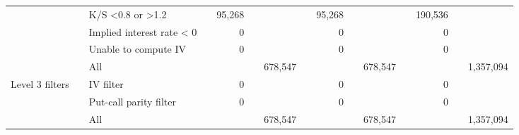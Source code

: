 \begin{tabular}{*{4}{l} *{11}{r} }
				  & & K/S <0.8 or >1.2 & &
				95,268 & &  & &
				95,268 & &  & &
				190,536 & &  \\
			
				  & & Implied interest rate < 0 & &
				0 & &  & &
				0 & &  & &
				0 & &  \\
			
				  & & Unable to compute IV & &
				0 & &  & &
				0 & &  & &
				0 & &  \\
			
				  & & All & &
				 & & 678,547 & &
				 & & 678,547 & &
				 & & 1,357,094 \\
			
				Level 3 filters & & IV filter & &
				0 & &  & &
				0 & &  & &
				0 & &  \\
			
				  & & Put-call parity filter & &
				0 & &  & &
				0 & &  & &
				0 & &  \\
			
				  & & All & &
				 & & 678,547 & &
				 & & 678,547 & &
				 & & 1,357,094 \\
			

	        \hline
	    \end{tabular}
	